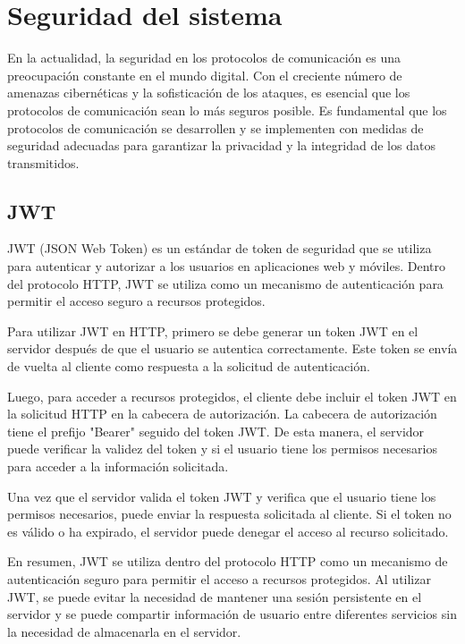 \section{Seguridad del sistema}

En la actualidad, la seguridad en los protocolos de comunicación es una preocupación constante en el mundo digital. Con el creciente número de amenazas cibernéticas y la sofisticación de los ataques, es esencial que los protocolos de comunicación sean lo más seguros posible. Es fundamental que los protocolos de comunicación se desarrollen y se implementen con medidas de seguridad adecuadas para garantizar la privacidad y la integridad de los datos transmitidos.


\subsection{JWT}

JWT (JSON Web Token) es un estándar de token de seguridad que se utiliza para autenticar y autorizar a los usuarios en aplicaciones web y móviles. Dentro del protocolo HTTP, JWT se utiliza como un mecanismo de autenticación para permitir el acceso seguro a recursos protegidos.

Para utilizar JWT en HTTP, primero se debe generar un token JWT en el servidor después de que el usuario se autentica correctamente. Este token se envía de vuelta al cliente como respuesta a la solicitud de autenticación.

Luego, para acceder a recursos protegidos, el cliente debe incluir el token JWT en la solicitud HTTP en la cabecera de autorización. La cabecera de autorización tiene el prefijo "Bearer" seguido del token JWT. De esta manera, el servidor puede verificar la validez del token y si el usuario tiene los permisos necesarios para acceder a la información solicitada.

Una vez que el servidor valida el token JWT y verifica que el usuario tiene los permisos necesarios, puede enviar la respuesta solicitada al cliente. Si el token no es válido o ha expirado, el servidor puede denegar el acceso al recurso solicitado.

En resumen, JWT se utiliza dentro del protocolo HTTP como un mecanismo de autenticación seguro para permitir el acceso a recursos protegidos. Al utilizar JWT, se puede evitar la necesidad de mantener una sesión persistente en el servidor y se puede compartir información de usuario entre diferentes servicios sin la necesidad de almacenarla en el servidor.


